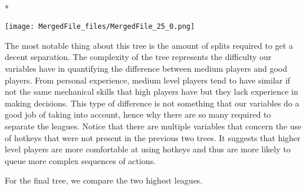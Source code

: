 \documentclass[letterpaper,10pt,english]{/usr/share/sphinx/texinputs/sphinxhowto}
\def\smaller{\fontsize{9.5pt}{9.5pt}\selectfont}
\newenvironment{InvisibleVerbatim}
        {\begin{mdframed}[leftmargin=0.1\linewidth,innerleftmargin=3pt,innerrightmargin=3pt, userdefinedwidth=1\linewidth, linewidth=0pt, linecolor=white, usetwoside=false]}
        {\end{mdframed}}
\begin{document}
    

        
        

            
                \makebox[0.1\linewidth]{\smaller\hfill\tt\color{nbframe-out-prompt}Out\hspace{4pt}{[}199{]}:\hspace{4pt}}\\*
                \vspace{-2.55\baselineskip}\begin{InvisibleVerbatim}
                \vspace{-0.5\baselineskip}
    \begin{center}
    \texttt{[image: MergedFile\_files/MergedFile\_25\_0.png]}
    \par
    \end{center}
    
            \end{InvisibleVerbatim}
            
        
    
The most notable thing about this tree is the amount of splits required
to get a decent separation. The complexity of the tree represents the
difficulty our variables have in quantifying the difference between
medium players and good players. From personal experience, medium level
players tend to have similar if not the same mechanical skills that high
players have but they lack experience in making decisions. This type of
difference is not something that our variables do a good job of taking
into account, hence why there are so many required to separate the
leagues. Notice that there are multiple variables that concern the use
of hotkeys that were not present in the previous two trees. It suggests
that higher level players are more comfortable at using hotkeys and thus
are more likely to queue more complex sequences of actions.

For the final tree, we compare the two highest leagues.

    

        
\end{document}
